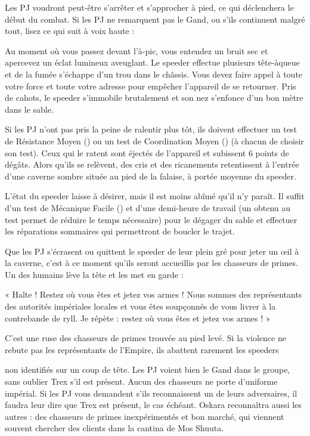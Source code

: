\documentclass[a4paper,10pt,twoside,twocolumn,openany]{book}
\begin{document}
Les PJ voudront peut-être s’arrêter et s’approcher à
pied, ce qui déclenchera le début du combat. Si les PJ ne
remarquent pas le Gand, ou s’ils continuent malgré tout,
lisez ce qui suit à voix haute :
\begin{quotebox}

Au moment où vous passez devant l’à-pic, vous entendez un bruit sec et apercevez un éclat lumineux
aveuglant. Le speeder effectue plusieurs tête-àqueue et de la fumée s’échappe d’un trou dans le
châssis. Vous devez faire appel à toute votre force
et toute votre adresse pour empêcher l’appareil
de se retourner. Pris de cahots, le speeder s’immobile brutalement et son nez s’enfonce d’un bon
mètre dans le sable.\end{quotebox}

Si les PJ n’ont pas pris la peine de ralentir plus tôt, ils
doivent effectuer un test de Résistance Moyen (\difficulty \difficulty)
ou un test de Coordination Moyen (\difficulty \difficulty) (à chacun
de choisir son test). Ceux qui le ratent sont éjectés de
l’appareil et subissent 6 points de dégâts. Alors qu’ils se
relèvent, des cris et des ricanements retentissent à l’entrée d’une caverne sombre située au pied de la falaise, à
portée moyenne du speeder.


L’état du speeder laisse à désirer, mais il est moins abîmé
qu’il n’y paraît. Il suffit d’un test de Mécanique Facile
(\difficulty) et d’une demi-heure de travail (un \advantage obtenu au test
permet de réduire le temps nécessaire) pour le dégager
du sable et effectuer les réparations sommaires qui permettront de boucler le trajet.

Que les PJ s’écrasent ou quittent le speeder de leur plein
gré pour jeter un œil à la caverne, c’est à ce moment
qu’ils seront accueillis par les chasseurs de primes. Un
des humains lève la tête et les met en garde :
\begin{quotebox}
« Halte ! Restez où vous êtes et jetez vos armes !
Nous sommes des représentants des autorités impériales locales et vous êtes soupçonnés de vous
livrer à la contrebande de ryll. Je répète : restez où
vous êtes et jetez vos armes ! »\end{quotebox}

C’est une ruse des chasseurs de primes trouvée au
pied levé. Si la violence ne rebute pas les représentants de l’Empire, ils abattent rarement les speeders

non identifiés sur un coup de tête. Les PJ voient bien le
Gand dans le groupe, sans oublier Trex s’il est présent.
Aucun des chasseurs ne porte d’uniforme impérial. Si
les PJ vous demandent s’ils reconnaissent un de leurs
adversaires, il faudra leur dire que Trex est présent, le
cas échéant. Oskara reconnaîtra aussi les autres : des
chasseurs de primes inexpérimentés et bon marché, qui
viennent souvent chercher des clients dans la cantina
de Mos Shuuta.
\end{document}

